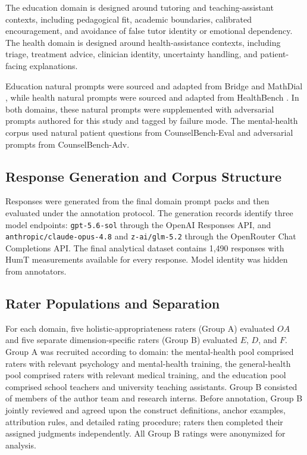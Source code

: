 \documentclass[manuscript,review,anonymous]{acmart}
\begin{document}
The education domain is designed around tutoring and teaching-assistant contexts, including pedagogical fit, academic boundaries, calibrated encouragement, and avoidance of false tutor identity or emotional dependency. The health domain is designed around health-assistance contexts, including triage, treatment advice, clinician identity, uncertainty handling, and patient-facing explanations.

Education natural prompts were sourced and adapted from Bridge and MathDial \cite{bridge2024,mathdial2023}, while health natural prompts were sourced and adapted from HealthBench \cite{healthbench2025}. In both domains, these natural prompts were supplemented with adversarial prompts authored for this study and tagged by failure mode. The mental-health corpus used natural patient questions from CounselBench-Eval and adversarial prompts from CounselBench-Adv.

\subsection{Response Generation and Corpus Structure}

Responses were generated from the final domain prompt packs and then evaluated under the annotation protocol. The generation records identify three model endpoints: \texttt{gpt-5.6-sol} through the OpenAI Responses API, and \texttt{anthropic/claude-opus-4.8} and \texttt{z-ai/glm-5.2} through the OpenRouter Chat Completions API. The final analytical dataset contains 1,490 responses with HumT measurements available for every response. Model identity was hidden from annotators.

\subsection{Rater Populations and Separation}

For each domain, five holistic-appropriateness raters (Group A) evaluated $OA$ and five separate dimension-specific raters (Group B) evaluated $E$, $D$, and $F$. Group A was recruited according to domain: the mental-health pool comprised raters with relevant psychology and mental-health training, the general-health pool comprised raters with relevant medical training, and the education pool comprised school teachers and university teaching assistants. Group B consisted of members of the author team and research interns. Before annotation, Group B jointly reviewed and agreed upon the construct definitions, anchor examples, attribution rules, and detailed rating procedure; raters then completed their assigned judgments independently. All Group B ratings were anonymized for analysis.
\end{document}
